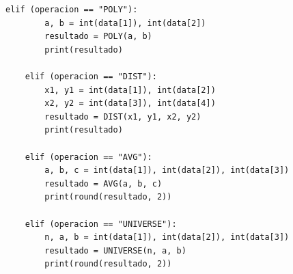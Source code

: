 \documentclass{article}
\begin{document}
\begin{lstlisting}[style=pythonstyle]
    elif (operacion == "POLY"):
        a, b = int(data[1]), int(data[2])
        resultado = POLY(a, b)
        print(resultado)
        
    elif (operacion == "DIST"):
        x1, y1 = int(data[1]), int(data[2])
        x2, y2 = int(data[3]), int(data[4])
        resultado = DIST(x1, y1, x2, y2)
        print(resultado)
        
    elif (operacion == "AVG"):
        a, b, c = int(data[1]), int(data[2]), int(data[3])
        resultado = AVG(a, b, c)
        print(round(resultado, 2))
        
    elif (operacion == "UNIVERSE"):
        n, a, b = int(data[1]), int(data[2]), int(data[3])
        resultado = UNIVERSE(n, a, b)
        print(round(resultado, 2))
\end{lstlisting}



\newpage

\thispagestyle{empty}

\vspace*{0.3\textwidth}

\begin{figure}[H]
  \centering
  
\end{figure}
\end{document}
